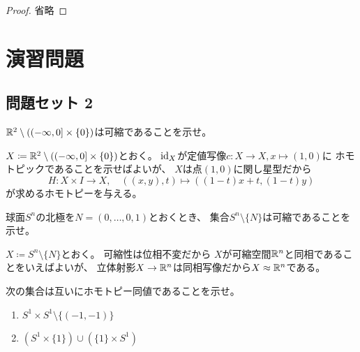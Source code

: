 \documentclass[report]{jlreq}
\begin{document}
\begin{proof}
    省略
\end{proof}

\begin{example}[円のブーケ]
    \TODO{}
\end{example}



%
\newpage
\section{演習問題}

\subsection{問題セット 2}

\begin{problem}[幾何学II 2.1]
    $\mathbb{R}^2 \setminus ((-\infty, 0] \times \{0\})$は可縮であることを示せ。
\end{problem}

\begin{answer}
    $X \coloneqq \mathbb{R}^2 \setminus ((-\infty, 0] \times \{0\})$とおく。
    $\mathrm{id}_X$が定値写像$c \colon X \to X, x \mapsto (1, 0)$に
    ホモトピックであることを示せばよいが、
    $X$は点$(1, 0)$に関し星型だから
    \begin{equation}
        H \colon X \times I \to X,
        \quad
        ((x, y), t) \mapsto ((1 - t) x + t, (1 - t) y)
    \end{equation}
    が求めるホモトピーを与える。
\end{answer}

\begin{problem}[幾何学II 2.2]
    球面$S^n$の北極を$N = (0, \dots, 0, 1)$とおくとき、
    集合$S^n \setminus \{N\}$は可縮であることを示せ。
\end{problem}

\begin{answer}
    $X \coloneqq S^n \setminus \{N\}$とおく。
    可縮性は位相不変だから
    $X$が可縮空間$\mathbb{R}^n$と同相であることをいえばよいが、
    立体射影$X \to \mathbb{R}^n$は同相写像だから$X \approx \mathbb{R}^n$である。
\end{answer}

\begin{problem}[幾何学II 2.3]
    次の集合は互いにホモトピー同値であることを示せ。
    \begin{enumerate}
        \item $S^1 \times S^1 \setminus \{ (-1, -1) \}$
        \item $(S^1 \times \{1\}) \cup (\{1\} \times S^1)$
    \end{enumerate}
\end{problem}
\end{document}
